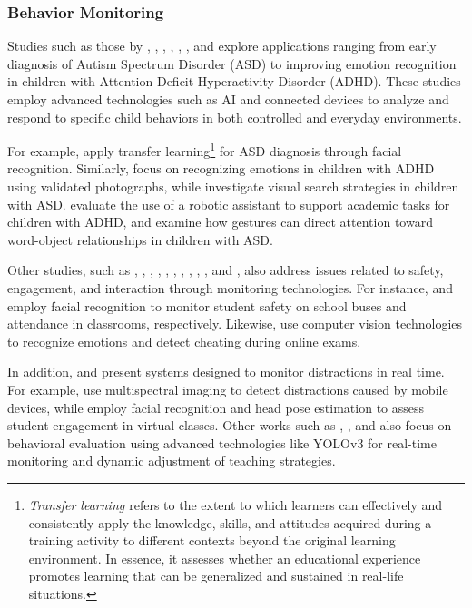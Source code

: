 		\subsubsection{Behavior Monitoring}
			Studies such as those by \cite{Akter2021}, \cite{Albrecht2014}, \cite{Berrezueta-Guzman2021}, \cite{Pelc2006}, \cite{VilliersRader2021}, \cite{Warren2015Brief}, and \cite{Washington2016AWereable} explore applications ranging from early diagnosis of Autism Spectrum Disorder (ASD) to improving emotion recognition in children with Attention Deficit Hyperactivity Disorder (ADHD). These studies employ advanced technologies such as AI and connected devices to analyze and respond to specific child behaviors in both controlled and everyday environments.
			
			For example, \cite{Akter2021} apply transfer learning\footnote{\textit{Transfer learning \cite{Akter2021}} refers to the extent to which learners can effectively and consistently apply the knowledge, skills, and attitudes acquired during a training activity to different contexts beyond the original learning environment. In essence, it assesses whether an educational experience promotes learning that can be generalized and sustained in real-life situations.} for ASD diagnosis through facial recognition. Similarly, \cite{Pelc2006} focus on recognizing emotions in children with ADHD using validated photographs, while \cite{Albrecht2014} investigate visual search strategies in children with ASD. \cite{Berrezueta-Guzman2021} evaluate the use of a robotic assistant to support academic tasks for children with ADHD, and \cite{VilliersRader2021} examine how gestures can direct attention toward word-object relationships in children with ASD.
			
			Other studies, such as \cite{Boumiza2017}, \cite{DaCosta2023}, \cite{Enadula2021}, \cite{Farsani2020}, \cite{Hachad2020}, \cite{James2019}, \cite{Kulkarni2023}, \cite{Kumar2024Zoom}, \cite{Muller2018ArchnSmile}, \cite{Narkhede2023}, and \cite{Ozdamli2022}, also address issues related to safety, engagement, and interaction through monitoring technologies. For instance, \cite{Hachad2020} and \cite{James2019} employ facial recognition to monitor student safety on school buses and attendance in classrooms, respectively. Likewise, \cite{Ozdamli2022} use computer vision technologies to recognize emotions and detect cheating during online exams.
			
			In addition, \cite{Campbell2015Using} and \cite{Ucar2022Recognizing} present systems designed to monitor distractions in real time. For example, \cite{Campbell2015Using} use multispectral imaging to detect distractions caused by mobile devices, while \cite{Ucar2022Recognizing} employ facial recognition and head pose estimation to assess student engagement in virtual classes. Other works such as \cite{Argel2023Intellitell}, \cite{Erazo2016Easing}, and \cite{Nguyen2019} also focus on behavioral evaluation using advanced technologies like YOLOv3 for real-time monitoring and dynamic adjustment of teaching strategies.
			
